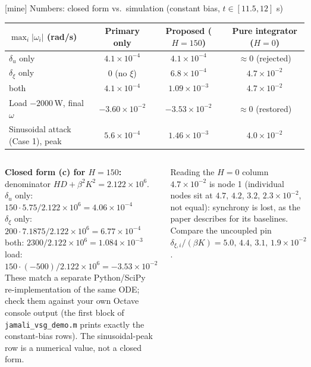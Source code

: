 \documentclass[aspectratio=169,9pt]{beamer}
\begin{document}
\begin{frame}[t]{[mine] Numbers: closed form vs.\ simulation (constant bias, $t\in[11.5,12]$ s)}
\footnotesize
\begin{center}
\begin{tabular}{@{}lccc@{}}
\toprule
$\max_i|\omega_i|$ (rad/s) & Primary only & Proposed ($H{=}150$) & Pure integrator ($H{=}0$)\\
\midrule
$\delta_u$ only & $4.1\times10^{-4}$ & $4.1\times10^{-4}$ & $\approx0$ (rejected)\\
$\delta_\xi$ only & $0$ (no $\xi$) & $6.8\times10^{-4}$ & $4.7\times10^{-2}$\\
both & $4.1\times10^{-4}$ & $1.09\times10^{-3}$ & $4.7\times10^{-2}$\\
\midrule
Load $-2000$\,W, final $\omega$ & $-3.60\times10^{-2}$ & $-3.53\times10^{-2}$ & $\approx0$ (restored)\\
Sinusoidal attack (Case 1), peak & $5.6\times10^{-4}$ & $1.46\times10^{-3}$ & $4.0\times10^{-2}$\\
\bottomrule
\end{tabular}
\end{center}
\vspace{-0.1cm}
\begin{columns}[T]
\textbf{Closed form (c) for $H=150$:} denominator $HD+\beta^2K^2=2.122\times10^6$.\\
$\delta_u$ only: $150\cdot5.75/2.122\!\times\!10^6=4.06\!\times\!10^{-4}$\\
$\delta_\xi$ only: $200\cdot7.1875/2.122\!\times\!10^6=6.77\!\times\!10^{-4}$\\
both: $2300/2.122\!\times\!10^6=1.084\!\times\!10^{-3}$\\
load: $150\cdot(-500)/2.122\!\times\!10^6=-3.53\!\times\!10^{-2}$
{\scriptsize These match a separate Python/SciPy re-implementation of the same ODE; check them against your own Octave console output (the first block of \texttt{jamali\_vsg\_demo.m} prints exactly the constant-bias rows). The sinusoidal-peak row is a numerical value, not a closed form.}
\begin{exampleblock}{Reading the $H{=}0$ column}
$4.7\times10^{-2}$ is node 1 (individual nodes sit at $4.7,\,4.2,\,3.2,\,2.3\times10^{-2}$, not equal): synchrony is lost, as the paper describes for its baselines. Compare the uncoupled pin $\delta_{\xi,i}/(\beta K)=5.0,\,4.4,\,3.1,\,1.9\times10^{-2}$.
\end{exampleblock}
\end{columns}
\end{frame}
\end{document}
